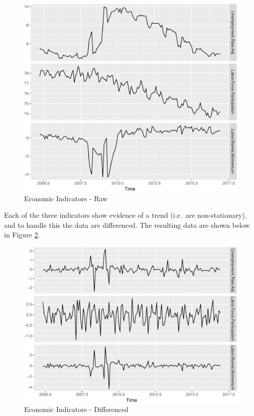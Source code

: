 \documentclass[12pt,letterpaper,toc=flat,oneside]{report}
\theoremstyle{definition}
\theoremstyle{definition}
\theoremstyle{definition}
\theoremstyle{remark}
\begin{document}
\begin{figure}[H]

{\centering \includegraphics{elliott-econometric-personnel-retention-18_files/figure-latex/econ-vars-1-1} 

}

\caption{Economic Indicators - Raw}\label{fig:econ-vars-1}
\end{figure}

Each of the three indicators show evidence of a trend (i.e.~are
non-stationary), and to handle this the data are differenced. The
resulting data are shown below in Figure \ref{fig:econ-vars-2}.

\begin{figure}[H]

{\centering \includegraphics{elliott-econometric-personnel-retention-18_files/figure-latex/econ-vars-2-1} 

}

\caption{Economic Indicators - Differenced}\label{fig:econ-vars-2}
\end{figure}
\end{document}
